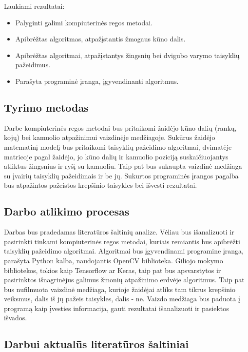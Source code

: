 \documentclass{VUMIFPSbakalaurinis}
\begin{document}
Laukiami rezultatai:
\begin{itemize}[topsep=5pt,itemsep=-1ex,partopsep=2ex,parsep=2ex]
 \item Palyginti galimi kompiuterinės regos metodai.
 \item Apibrėžtas algoritmas, atpažįstantis žmogaus kūno dalis.
 \item Apibrėžtas algoritmai, atpažįstantys žingsnių bei dvigubo varymo taisyklių pažeidimus.
 \item Parašyta programinė įranga, įgyvendinanti algoritmus.
\end{itemize}

\subsection{Tyrimo metodas}
Darbe kompiuterinės regos metodai bus pritaikomi žaidėjo kūno dalių (rankų, kojų) bei kamuolio atpažinimui vaizdinėje medžiagoje. Sukūrus žaidėjo matematinį modelį bus pritaikomi taisyklių pažeidimo algoritmai, dvimatėje matricoje pagal žaidėjo, jo kūno dalių ir kamuolio poziciją suskaičiuojantys atliktus žingsnius ir ryšį su kamuoliu. Taip pat bus sukaupta vaizdinė medžiaga su įvairių taisyklių pažeidimais ir be jų. Sukurtos programinės įrangos pagalba bus atpažintos pažeistos krepšinio taisykles bei išvesti rezultatai.

\subsection{Darbo atlikimo procesas}
Darbas bus pradedamas literatūros šaltinių analize. Vėliau bus išanalizuoti ir pasirinkti tinkami kompiuterinės regos metodai, kuriais remiantis bus apibrėžti taisyklių pažeidimo algoritmai. Algoritmai bus įgyvendinami programine įranga, parašyta Python kalba, naudojantis OpenCV biblioteka. Giliojo mokymo bibliotekos, tokios kaip Tensorflow ar Keras, taip pat bus apsvarstytos ir pasirinktos išnagrinėjus galimus žmonių atpažinimo erdvėje algoritmus. Taip pat bus nufilmuota vaizdinė medžiaga, kurioje žaidėjai atliks tam tikrus krepšinio veiksmus, dalis iš jų pažeis taisykles, dalis - ne. Vaizdo medžiaga bus paduota į programą kaip įvesties informacija, gauti rezultatai išanalizuoti ir pasiektos išvados. 

\subsection{Darbui aktualūs literatūros šaltiniai}
\end{document}

